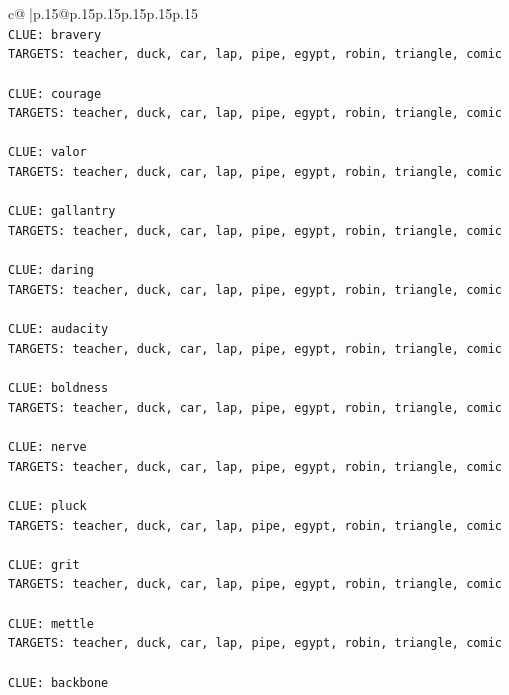 \documentclass{article}
\begin{document}
{\begin{supertabular}{c@{$\;$}|p{.15\linewidth}@{}p{.15\linewidth}p{.15\linewidth}p{.15\linewidth}p{.15\linewidth}p{.15\linewidth}}
{{{\\ 
\texttt{CLUE: bravery} \\
\texttt{TARGETS: teacher, duck, car, lap, pipe, egypt, robin, triangle, comic} \\
\\ 
\texttt{CLUE: courage} \\
\texttt{TARGETS: teacher, duck, car, lap, pipe, egypt, robin, triangle, comic} \\
\\ 
\texttt{CLUE: valor} \\
\texttt{TARGETS: teacher, duck, car, lap, pipe, egypt, robin, triangle, comic} \\
\\ 
\texttt{CLUE: gallantry} \\
\texttt{TARGETS: teacher, duck, car, lap, pipe, egypt, robin, triangle, comic} \\
\\ 
\texttt{CLUE: daring} \\
\texttt{TARGETS: teacher, duck, car, lap, pipe, egypt, robin, triangle, comic} \\
\\ 
\texttt{CLUE: audacity} \\
\texttt{TARGETS: teacher, duck, car, lap, pipe, egypt, robin, triangle, comic} \\
\\ 
\texttt{CLUE: boldness} \\
\texttt{TARGETS: teacher, duck, car, lap, pipe, egypt, robin, triangle, comic} \\
\\ 
\texttt{CLUE: nerve} \\
\texttt{TARGETS: teacher, duck, car, lap, pipe, egypt, robin, triangle, comic} \\
\\ 
\texttt{CLUE: pluck} \\
\texttt{TARGETS: teacher, duck, car, lap, pipe, egypt, robin, triangle, comic} \\
\\ 
\texttt{CLUE: grit} \\
\texttt{TARGETS: teacher, duck, car, lap, pipe, egypt, robin, triangle, comic} \\
\\ 
\texttt{CLUE: mettle} \\
\texttt{TARGETS: teacher, duck, car, lap, pipe, egypt, robin, triangle, comic} \\
\\ 
\texttt{CLUE: backbone} \\
}}}
\end{supertabular}}
\end{document}
